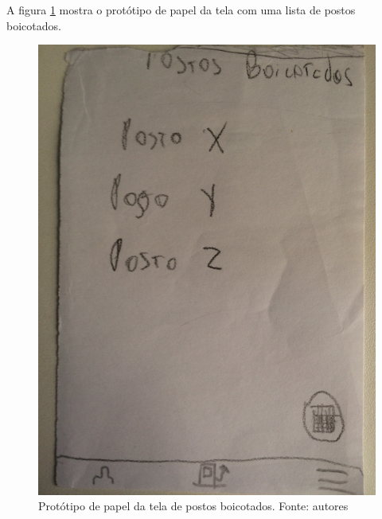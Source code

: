 A figura \ref{img:prototipo_de_papel_postos_boicotados} mostra o protótipo de papel da tela com uma lista de postos boicotados.
\begin{figure}[H]
    \centering
    \includegraphics[scale=0.1, angle=-90]{figuras/prototipo_papel_postos_boicotados.jpg}
    \caption[Protótipo de papel da tela de postos boicotados]{Protótipo de papel da tela de postos boicotados. Fonte: autores}
    \label{img:prototipo_de_papel_postos_boicotados}
\end{figure}
 \pagebreak

